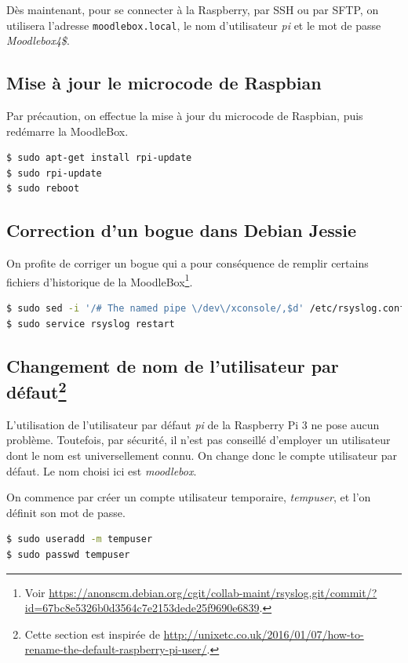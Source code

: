 \documentclass[11pt]{article}
\begin{document}
Dès maintenant, pour se connecter à la Raspberry, par SSH ou par SFTP, on utilisera l'adresse \lstinline{moodlebox.local}, le nom d'utilisateur \emph{pi} et le mot de passe \emph{Moodlebox4\$}.

\subsection{Mise à jour le microcode de Raspbian}

Par précaution, on effectue la mise à jour du microcode de Raspbian, puis redémarre la MoodleBox.

\begin{lstlisting}[language=bash]
$ sudo apt-get install rpi-update
$ sudo rpi-update
$ sudo reboot
\end{lstlisting}

\subsection{Correction d'un bogue dans Debian Jessie}

On profite de corriger un bogue qui a pour conséquence de remplir certains fichiers d'historique de la MoodleBox\footnote{Voir \url{https://anonscm.debian.org/cgit/collab-maint/rsyslog.git/commit/?id=67bc8e5326b0d3564c7e2153dede25f9690e6839}.}.

\begin{lstlisting}[language=bash]
$ sudo sed -i '/# The named pipe \/dev\/xconsole/,$d' /etc/rsyslog.conf
$ sudo service rsyslog restart
\end{lstlisting}

\subsection[Changement de nom de l'utilisateur par défaut]{Changement de nom de l'utilisateur par défaut\footnote{Cette section est inspirée de \url{http://unixetc.co.uk/2016/01/07/how-to-rename-the-default-raspberry-pi-user/}.}}

L'utilisation de l'utilisateur par défaut \emph{pi} de la Raspberry Pi 3 ne pose aucun problème. Toutefois, par sécurité, il n'est pas conseillé d'employer un utilisateur dont le nom est universellement connu. On change donc le compte utilisateur par défaut. Le nom choisi ici est \emph{moodlebox}.

On commence par créer un compte utilisateur temporaire, \emph{tempuser}, et l'on définit son mot de passe.
\begin{lstlisting}[language=bash]
$ sudo useradd -m tempuser
$ sudo passwd tempuser
\end{lstlisting}
\end{document}
